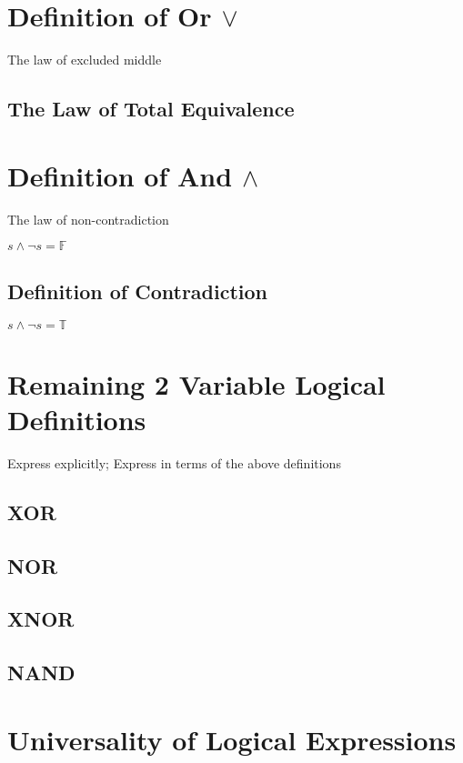 \documentclass[11pt]{article}
\begin{document}
\section{Definition of Or $\lor$}
The law of excluded middle
\begin{center}
\end{center}
\subsection{The Law of Total Equivalence}


\section{Definition of And $\land$}
The law of non-contradiction
\begin{center}
$
s \land \lnot s = \mathbb{F}
$
\end{center}
\subsection{Definition of Contradiction}
\begin{center}
$
s \land \lnot s = \mathbb{T}
$
\end{center}








\section{Remaining 2 Variable Logical Definitions}
Express explicitly; Express in terms of the above definitions
\subsection{XOR}
\subsection{NOR}
\subsection{XNOR}
\subsection{NAND}






\section{Universality of Logical Expressions}
\end{document}
